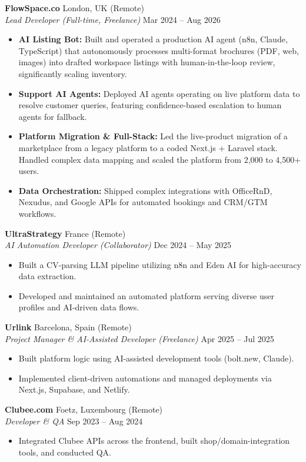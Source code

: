 \documentclass[10pt,a4paper]{article}
\begin{document}
\textbf{FlowSpace.co} \hfill London, UK (Remote) \\
\textit{Lead Developer (Full-time, Freelance)} \hfill Mar 2024 -- Aug 2026
\begin{itemize}
    \item \textbf{AI Listing Bot:} Built and operated a production AI agent (n8n, Claude, TypeScript) that autonomously processes multi-format brochures (PDF, web, images) into drafted workspace listings with human-in-the-loop review, significantly scaling inventory.
    \item \textbf{Support AI Agents:} Deployed AI agents operating on live platform data to resolve customer queries, featuring confidence-based escalation to human agents for fallback.
    \item \textbf{Platform Migration \& Full-Stack:} Led the live-product migration of a marketplace from a legacy platform to a coded Next.js + Laravel stack. Handled complex data mapping and scaled the platform from 2,000 to 4,500+ users.
    \item \textbf{Data Orchestration:} Shipped complex integrations with OfficeRnD, Nexudus, and Google APIs for automated bookings and CRM/GTM workflows.
\end{itemize}

\textbf{UltraStrategy} \hfill France (Remote) \\
\textit{AI Automation Developer (Collaborator)} \hfill Dec 2024 -- May 2025
\begin{itemize}
    \item Built a CV-parsing LLM pipeline utilizing n8n and Eden AI for high-accuracy data extraction.
    \item Developed and maintained an automated platform serving diverse user profiles and AI-driven data flows.
\end{itemize}

\textbf{Urlink} \hfill Barcelona, Spain (Remote) \\
\textit{Project Manager \& AI-Assisted Developer (Freelance)} \hfill Apr 2025 -- Jul 2025
\begin{itemize}
    \item Built platform logic using AI-assisted development tools (bolt.new, Claude).
    \item Implemented client-driven automations and managed deployments via Next.js, Supabase, and Netlify.
\end{itemize}

\textbf{Clubee.com} \hfill Foetz, Luxembourg (Remote) \\
\textit{Developer \& QA} \hfill Sep 2023 -- Aug 2024
\begin{itemize}
    \item Integrated Clubee APIs across the frontend, built shop/domain-integration tools, and conducted QA.
\end{itemize}
\end{document}

